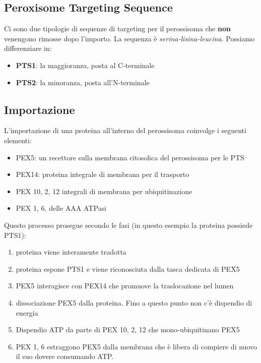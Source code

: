     \subsection{Peroxisome Targeting Sequence}
        Ci sono due tipologie di sequenze di targeting per il perossisoma che \textbf{non} venengono rimosse dopo l'importo. 
        La sequenza è \textit{serina-lisina-leucina}. Possiamo differenziare in:
        \begin{itemize}
            \item \textbf{PTS1}: la maggioranza, posta al C-terminale 
            \item \textbf{PTS2}: la minoranza, posta all'N-terminale
        \end{itemize}
        
    \subsection{Importazione}
        L'importazione di una proteina all'interno del perossisoma coinvolge i seguenti elementi:
        \begin{itemize}
            \item PEX5: un recettore sulla membrana citosolica del perossisoma per le PTS
            \item PEX14: proteina integrale di membrana per il trasporto
            \item PEX 10, 2, 12 integrali di membrana per ubiquitinazione
            \item PEX 1, 6, delle AAA ATPasi 
        \end{itemize}
        Questo processo prosegue secondo le fasi (in questo esempio la proteina possiede PTS1):
        \begin{enumerate}
            \item proteina viene interamente tradotta
            \item proteina espone PTS1 e viene riconosciuta dalla tasca dedicata di PEX5
            \item PEX5 interagisce con PEX14 che promuove la traslocazione nel lumen
            \item dissociazione PEX5 dalla proteina. Fino a questo punto non c'è dispendio di energia
            \item Dispendio ATP da parte di PEX 10, 2, 12 che mono-ubiquitinano PEX5
            \item PEX 1, 6 estraggono PEX5 dalla membrana che è libera di compiere di nuovo il suo dovere consumando ATP.
        \end{enumerate}
